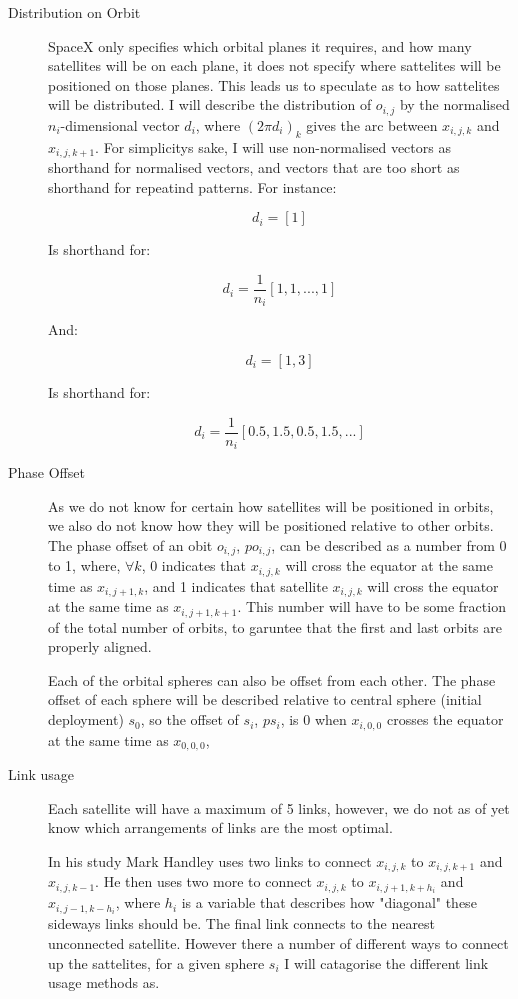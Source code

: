 \documentclass[12pt]{article}
\begin{document}
\begin{description}
\item[Distribution on Orbit]
SpaceX only specifies which orbital planes it requires, and how many satellites will be on each plane, it does not specify where sattelites will be positioned on those planes. This leads us to speculate as to how sattelites will be distributed. I will describe the distribution of $o_{i,j}$ by the normalised $n_i$-dimensional vector $d_i$, where $(2\pi d_i)_k$ gives the arc between $x_{i,j,k}$ and $x_{i,j,k+1}$. For simplicitys sake, I will use non-normalised vectors as shorthand for normalised vectors, and vectors that are too short as shorthand for repeatind patterns. For instance:

\[d_i = [1]\] 

Is shorthand for:

\[d_i = \frac{1}{n_i}[1,1,...,1]\] 

And:

\[d_i = [1,3]\] 

Is shorthand for:

\[d_i = \frac{1}{n_i}[0.5,1.5,0.5,1.5,...]\]

	
\item[Phase Offset]
As we do not know for certain how satellites will be positioned in orbits, we also do not know how they will be positioned relative to other orbits. The phase offset of an obit $o_{i,j}$, $po_{i,j}$, can be described as a number from 0 to 1, where, $\forall k$, 0 indicates that  $x_{i,j,k}$ will cross the equator at the same time as $x_{i,j+1,k}$, and 1 indicates that satellite $x_{i,j,k}$ will cross the equator at the same time as $x_{i,j+1,k+1}$. This number will have to be some fraction of the total number of orbits, to garuntee that the first and last orbits are properly aligned.

Each of the orbital spheres can also be offset from each other. The phase offset of each sphere will be described relative to central sphere (initial deployment) $s_0$, so the offset of $s_i$, $ps_i$, is 0 when $x_{i,0,0}$ crosses the equator at the same time as $x_{0,0,0}$, %

\item[Link usage]
Each satellite will have a maximum of 5 links, however, we do not as of yet know which arrangements of links are the most optimal.

In his study Mark Handley uses two links to connect $x_{i,j,k}$ to $x_{i,j,k+1}$ and $x_{i,j,k-1}$. He then uses two more to connect $x_{i,j,k}$ to $x_{i,j+1,k+h_i}$ and $x_{i,j-1,k-h_i}$, where $h_i$ is a variable that describes how "diagonal" these sideways links should be. The final link connects to the nearest unconnected satellite. However there a number of different ways to connect up the sattelites, for a given sphere $s_i$ I will catagorise the different link usage methods as.


\end{description}
\end{document}
